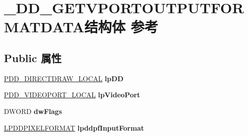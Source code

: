 \hypertarget{struct___d_d___g_e_t_v_p_o_r_t_o_u_t_p_u_t_f_o_r_m_a_t_d_a_t_a}{}\section{\+\_\+\+D\+D\+\_\+\+G\+E\+T\+V\+P\+O\+R\+T\+O\+U\+T\+P\+U\+T\+F\+O\+R\+M\+A\+T\+D\+A\+T\+A结构体 参考}
\label{struct___d_d___g_e_t_v_p_o_r_t_o_u_t_p_u_t_f_o_r_m_a_t_d_a_t_a}
\subsection*{Public 属性}
\begin{DoxyCompactItemize}
\item 
\mbox{\label{struct___d_d___g_e_t_v_p_o_r_t_o_u_t_p_u_t_f_o_r_m_a_t_d_a_t_a_a9221cd669824a024ca84e004dd807edb}} 
\hyperlink{struct___d_d___d_i_r_e_c_t_d_r_a_w___l_o_c_a_l}{P\+D\+D\+\_\+\+D\+I\+R\+E\+C\+T\+D\+R\+A\+W\+\_\+\+L\+O\+C\+AL} {\bfseries lp\+DD}
\item 
\mbox{\label{struct___d_d___g_e_t_v_p_o_r_t_o_u_t_p_u_t_f_o_r_m_a_t_d_a_t_a_a49a664fbe2c3893cbc0331cf620ed6fd}} 
\hyperlink{struct___d_d___v_i_d_e_o_p_o_r_t___l_o_c_a_l}{P\+D\+D\+\_\+\+V\+I\+D\+E\+O\+P\+O\+R\+T\+\_\+\+L\+O\+C\+AL} {\bfseries lp\+Video\+Port}
\item 
\mbox{\label{struct___d_d___g_e_t_v_p_o_r_t_o_u_t_p_u_t_f_o_r_m_a_t_d_a_t_a_ab0bacdbee1900d2dee066f5460ff8aae}} 
D\+W\+O\+RD {\bfseries dw\+Flags}
\item 
\mbox{\label{struct___d_d___g_e_t_v_p_o_r_t_o_u_t_p_u_t_f_o_r_m_a_t_d_a_t_a_a9173868ea19886f39bfcdefd08559aaf}} 
\hyperlink{interfacevoid}{L\+P\+D\+D\+P\+I\+X\+E\+L\+F\+O\+R\+M\+AT} {\bfseries lpddpf\+Input\+Format}
\item 
\mbox{\label{struct___d_d___g_e_t_v_p_o_r_t_o_u_t_p_u_t_f_o_r_m_a_t_d_a_t_a_a8fc7dfe650150282c22ae5165a29a506}} 

\end{DoxyCompactItemize}
